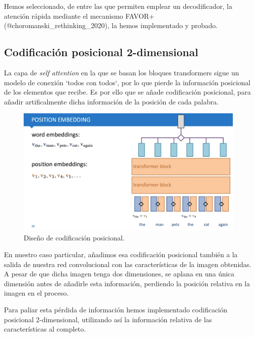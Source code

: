 \documentclass[a4paper, 20pt, dvipsnames]{article}
\begin{document}
Hemos seleccionado, de entre las que permiten emplear un decodificador, la atención rápida mediante el mecanismo FAVOR+ (@choromanski\_rethinking\_2020), la hemos implementado y probado.


\subsection{Codificación posicional 2-dimensional}

La capa de \emph{self attention} en la que se basan los bloques transformers sigue un modelo de conexión `todos con todos`, por lo que pierde la información posicional de los elementos que recibe. Es por ello que se añade codificación posicional, para añadir artificalmente dicha información de la posición de cada palabra.


\begin{figure}[H]
	\centering
	\includegraphics[scale=0.15]{fig/positional}
	\caption{Diseño de codificación posicional.}
\end{figure}


En nuestro caso particular, añadimos esa codificación posicional también a la salida de nuestra red convolucional con las características de la imagen obtenidas. A pesar de que dicha imagen tenga dos dimensiones, se aplana en una única dimensión antes de añadirle esta información, perdiendo la posición relativa en la imagen en el proceso.

Para paliar esta pérdida de información hemos implementado codificación posicional 2-dimensional, utilizando así la información relativa de las características al completo.
\end{document}
